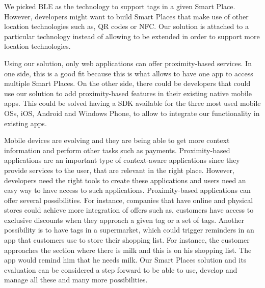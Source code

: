 We picked \gls{BLE} as the technology to support tags in a given Smart Place.
However, developers might want to build Smart Places that make use of other location technologies such as, \gls{QR} codes or \gls{NFC}.
Our solution is attached to a particular technology instead of allowing to be extended in order to support more location technologies.

Using our solution, only web applications can offer proximity-based services.
In one side, this is a good fit because this is what allows to have one app to access multiple Smart Places.
On the other side, there could be developers that could use our solution to add proximity-based features in their existing native mobile apps.
This could be solved having a \gls{SDK} available for the three most used mobile \glspl{OS}, iOS, Android and Windows Phone, to allow to integrate our functionality in existing apps.

Mobile devices are evolving and they are being able to get more context information and perform other tasks such as payments.
Proximity-based applications are an important type of context-aware applications since they provide services to the user, that are relevant in the right place.
However, developers need the right tools to create these applications and users need an easy way to have access to such applications.
Proximity-based applications can offer several possibilities.
For instance, companies that have online and physical stores could achieve more integration of offers such as, customers have access to exclusive discounts when they approach a given tag or a set of tags.
Another possibility is to have tags in a supermarket, which could trigger reminders in an app that customers use to store their shopping list.
For instance, the customer approaches the section where there is milk and this is on his shopping list. The app would remind him that he needs milk.
Our Smart Places solution and its evaluation can be considered a step forward to be able to use, develop and manage all these and many more possibilities.
